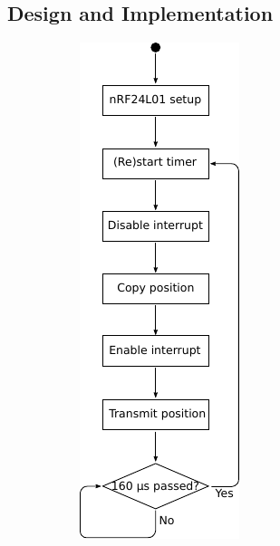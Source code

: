 \subsection{Design and Implementation} %
\label{sub:design_and_implementation}
\begin{figure}[h]
	\centering
	\begin{subfigure}[b]{0.30\textwidth}
		\centering
		\includegraphics[width=.8\linewidth]{graphics/joint_software_diagram}

\end{subfigure}
\end{figure}
